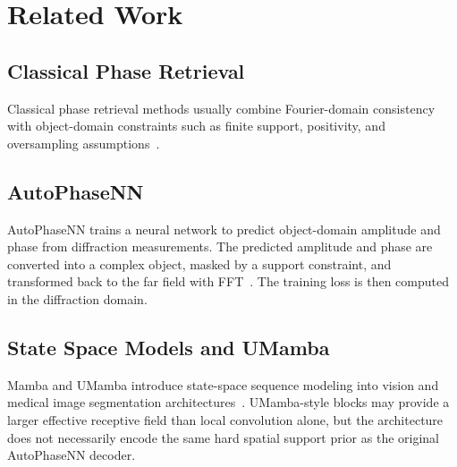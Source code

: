 \section{Related Work}

\subsection{Classical Phase Retrieval}
Classical phase retrieval methods usually combine Fourier-domain consistency
with object-domain constraints such as finite support, positivity, and
oversampling assumptions~\cite{gerchberg1972practical,fienup1982phase}.

\subsection{AutoPhaseNN}
AutoPhaseNN trains a neural network to predict object-domain amplitude and phase
from diffraction measurements. The predicted amplitude and phase are converted
into a complex object, masked by a support constraint, and transformed back to
the far field with FFT~\cite{autophasenn}. The training loss is then computed
in the diffraction domain.

\subsection{State Space Models and UMamba}
Mamba and UMamba introduce state-space sequence modeling into vision and medical
image segmentation architectures~\cite{gu2023mamba,umamba}. UMamba-style blocks
may provide a larger effective receptive field than local convolution alone, but
the architecture does not necessarily encode the same hard spatial support prior
as the original AutoPhaseNN decoder.
